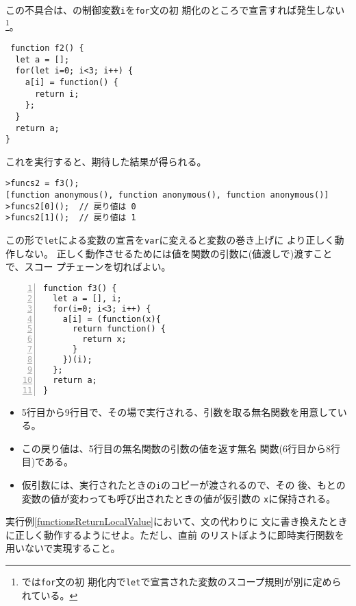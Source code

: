 \begin{Exec}\upshape\label{declareVariableInFor}
この不具合は、の制御変数\Verb+i+を\Verb+for+文の初
 期化のところで宣言すれば発生しない\footnote{\ES では\texttt{for}文の初
 期化内で\texttt{let}で宣言された変数のスコープ規則が別に定められている。}。
\begin{Verbatim}
 function f2() {
  let a = [];
  for(let i=0; i<3; i++) {
    a[i] = function() {
      return i;
    };
  }
  return a;
}
\end{Verbatim}
これを実行すると、期待した結果が得られる。
\begin{Verbatim}
>funcs2 = f3();
[function anonymous(), function anonymous(), function anonymous()]
>funcs2[0]();  // 戻り値は 0
>funcs2[1]();  // 戻り値は 1
\end{Verbatim}

この形で\Verb+let+による変数の宣言を\Verb+var+に変えると変数の巻き上げに
 より正しく動作しない。
%
正しく動作させるためには値を関数の引数に(値渡しで)渡すことで、スコー
 プチェーンを切ればよい。
 \begin{Verbatim}[numbers=left]
function f3() {
  let a = [], i;
  for(i=0; i<3; i++) {
    a[i] = (function(x){
      return function() {
        return x;
      }
    })(i);
  };
  return a;
}
 \end{Verbatim}
\begin{itemize}
 \item 5行目から9行目で、その場で実行される、引数を取る無名関数を用意している。
 \item この戻り値は、5行目の無名関数の引数の値を返す無名
       関数(6行目から8行目)である。
 \item 仮引数には、実行されたときの\Verb+i+のコピーが渡されるので、その
       後、もとの変数の値が変わっても呼び出されたときの値が仮引数の
       \texttt{x}に保持される。
\end{itemize}
\end{Exec}
\begin{Prob}\upshape
 実行例\ref{functionsReturnLocalValue}において、文の代わりに
 文に書き換えたときに正しく動作するようにせよ。ただし、直前
 のリストぼように即時実行関数を用いないで実現すること。
\end{Prob}
